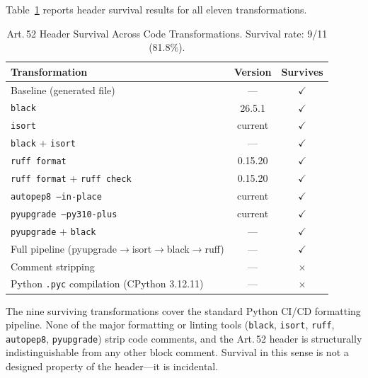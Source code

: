 \documentclass[conference]{IEEEtran}
\begin{document}
Table~\ref{tab:survival} reports header survival results for all eleven
transformations.

\begin{table}[htbp]
\caption{Art.\,52 Header Survival Across Code Transformations.
         Survival rate: 9/11 (81.8\%).}
\label{tab:survival}
\begin{center}
\begin{tabular}{lcc}
\toprule
Transformation & Version & Survives \\
\midrule
Baseline (generated file)                      & ---        & $\checkmark$ \\
\texttt{black}                                 & 26.5.1     & $\checkmark$ \\
\texttt{isort}                                 & current    & $\checkmark$ \\
\texttt{black} + \texttt{isort}                & ---        & $\checkmark$ \\
\texttt{ruff format}                           & 0.15.20    & $\checkmark$ \\
\texttt{ruff format} + \texttt{ruff check}     & 0.15.20    & $\checkmark$ \\
\texttt{autopep8 --in-place}                   & current    & $\checkmark$ \\
\texttt{pyupgrade --py310-plus}                & current    & $\checkmark$ \\
\texttt{pyupgrade} + \texttt{black}            & ---        & $\checkmark$ \\
Full pipeline (pyupgrade$\to$isort$\to$black$\to$ruff) & --- & $\checkmark$ \\
Comment stripping                              & ---        & $\times$     \\
Python \texttt{.pyc} compilation (CPython 3.12.11) & ---    & $\times$     \\
\bottomrule
\end{tabular}
\end{center}
\end{table}

The nine surviving transformations cover the standard Python CI/CD
formatting pipeline.  None of the major formatting or linting tools
(\texttt{black}, \texttt{isort}, \texttt{ruff}, \texttt{autopep8},
\texttt{pyupgrade}) strip code comments, and the Art.\,52 header is
structurally indistinguishable from any other block comment.  Survival
in this sense is not a designed property of the header---it is
incidental.
\end{document}
